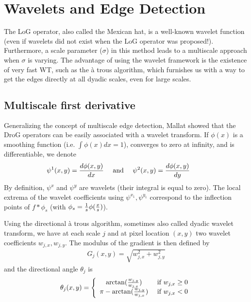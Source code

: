 \clearpage
\newpage

\section{Wavelets and Edge Detection}
The LoG operator, also called the Mexican hat, is a well-known 
wavelet function
(even if wavelets did not exist when the LoG operator was proposed!).
Furthermore, a scale parameter ($\sigma$) in this method leads to 
a multiscale approach when $\sigma$ is varying. The advantage of using
the wavelet framework is the existence of very fast WT, such as the \`a trous
algorithm, which furnishes us with a  way to get the edges directly at all 
dyadic scales, even for large scales.

\subsection{Multiscale first derivative}

Generalizing the concept of multiscale edge detection, 
Mallat \cite{edge:mallat92a,edge:mallat92b,ima:mallat98} showed that 
the DroG operators can be easily associated with a wavelet
transform.
If $\phi(x)$ is a smoothing function (i.e. $\int \phi(x) dx = 1$), 
converges to zero at infinity, and is differentiable, we denote
\begin{eqnarray}
\psi^{1}(x,y) = {{d \phi(x,y)} \over {dx}} \quad \mbox{ and } \quad
\psi^{2}(x,y) = {{d \phi(x,y)} \over {dy}} \quad \mbox{     } \quad
 \end{eqnarray}
By definition, $\psi^x$ and $\psi^y$ are wavelets
(their integral is equal to zero). The local extrema of the wavelet coefficients
using $\psi^{x_1},\psi^{y_1}$ correspond to the inflection points of $f*\phi_s$ 
(with $\phi_s = {1 \over s} \phi({x\over s})$).

Using the directional \`a trous algorithm, sometimes also called dyadic wavelet
transform, we have at each scale $j$ and at pixel location $(x,y)$ two wavelet
coefficients $w_{j,x}, w_{j,y}$. The modulus of the gradient is then defined by
\begin{eqnarray}
G_j(x,y) = \sqrt{ w_{j,x}^2 + w_{j,y}^2}
\end{eqnarray}
and the directional angle $\theta_j$ is
\begin{eqnarray}
\theta_j(x,y) = \left\{ \begin{array}{cc}
 \arctan({w_{j,y} \over w_{j,x}})  & \mbox{ if } w_{j,x} \ge 0 \\
 \pi - \arctan({w_{j,y} \over w_{j,x}})  & \mbox{ if } w_{j,x} < 0
\end{array}\right.
\end{eqnarray}
  
